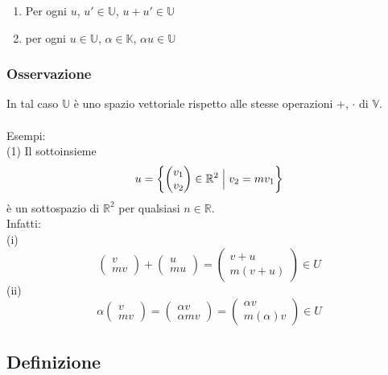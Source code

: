 \documentclass[12pt]{article}
\begin{document}
\begin{enumerate}
    \item Per ogni $u$, $u' \in \mathbb{U}$, $u+u' \in \mathbb{U}$
    \item per ogni $u \in \mathbb{U}$, $\alpha \in \mathbb{K}$, $\alpha u \in \mathbb{U}$
\end{enumerate}

\subsubsection{Osservazione}

In tal caso $\mathbb{U}$ è uno spazio vettoriale rispetto alle stesse operazioni +, $\cdot $ di $\mathbb{V}$.
\\\\
Esempi:\\
(1) Il sottoinsieme\\
    \[u = \left\{ \begin{pmatrix}
        v_1\\
        v_2
    \end{pmatrix} \in \mathbb{R}^2 \Bigm\vert v_2 = mv_1   \right\}\]
è un sottospazio di $\mathbb{R}^2$ per qualsiasi $n \in \mathbb{R}$.\\
Infatti:\\
(i)
\[\begin{pmatrix}
    v\\
    mv
\end{pmatrix} + \begin{pmatrix}
    u\\
    mu
\end{pmatrix} = \begin{pmatrix}
    v+u\\
    m(v+u)
\end{pmatrix} \in U\]
(ii)
\[\alpha \begin{pmatrix}
    v\\
    mv
\end{pmatrix} = \begin{pmatrix}
    \alpha v\\
    \alpha mv
\end{pmatrix} = \begin{pmatrix}
    \alpha v\\
    m (\alpha)v
\end{pmatrix} \in U\]

\subsection{Definizione}
\end{document}
